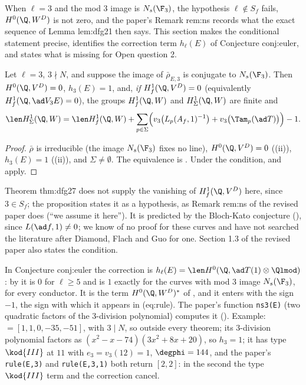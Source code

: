 When $\ell=3$ and the mod $3$ image is $N_s(\F_3)$, the hypothesis $\ell\notin S_f$ fails, $H^0(\Q,W^D)$ is not zero, and the paper's Remark rem:ns records what the
exact sequence of Lemma lem:dfg21 then says. This section makes the conditional statement precise, identifies the correction term $h_\ell(E)$ of Conjecture
conj:euler, and states what is missing for Open question 2.

\begin{proposition}\label{prop:blochkato:rem-ns}
Let $\ell=3$, $3\nmid N$, and suppose the image of $\bar\rho_{E,3}$ is conjugate to $N_s(\F_3)$. Then $H^0(\Q,V^D)=0$, $h_3(E)=1$, and, \emph{if} $H^1_f(\Q,V^D)=0$ (equivalently
$H^1_f(\Q,\ad V_3E)=0$), the groups $H^1_f(\Q,W)$ and $H^1_\Sigma(\Q,W)$ are finite and
\[
\len H^1_\Sigma(\Q,W)=\len H^1_f(\Q,W)+\sum_{p\in\Sigma}\Bigl(v_3\bigl(L_p(A_f,1)^{-1}\bigr)+v_3\bigl(\Tam_p(\ad T)\bigr)\Bigr)-1 .
\]
\end{proposition}

\begin{proof}
$\bar\rho$ is irreducible (the image $N_s(\F_3)$ fixes no line), $H^0(\Q,V^D)=0$ ((ii)), $h_3(E)=1$ ((ii)), and
$\Sigma\ne\emptyset$. The equivalence is . Under the condition,  and  apply.
\end{proof}

Theorem thm:dfg27 does not supply the vanishing of $H^1_f(\Q,V^D)$ here, since $3\in S_f$; the proposition states it as a hypothesis, as Remark rem:ns of the revised
paper does (``we assume it here''). It is predicted by the Bloch-Kato conjecture (), since $L(\ad f,1)\ne0$; we know of no proof for these
curves and have not searched the literature after Diamond, Flach and Guo for one. Section 1.3 of the revised paper also states the condition.

\begin{remark}\label{rem:blochkato:conj-euler-h}
In Conjecture conj:euler the correction is $h_\ell(E)=\len H^0(\Q,\ad T(1)\otimes\Qlmod)$: by  it is $0$ for $\ell\ge5$ and is $1$ exactly for the curves
with mod $3$ image $N_s(\F_3)$, for every conductor. It is the term $H^0(\Q,W^D)^*$ of , and it enters  with the sign $-1$,
the sign with which it appears in (eq:rule). The paper's function \texttt{ns3(E)} (two quadratic factors of the $3$-division polynomial) computes it ().
Example:  $=[1,1,0,-35,-51]$, with $3\mid N$, so outside every theorem; its $3$-division polynomial factors as $(x^2-x-74)(3x^2+8x+20)$, so $h_3=1$; it has
type $\kod{III}$ at $11$ with $e_3=v_3(12)=1$, $\degphi=144$, and the paper's \texttt{rule(E,3)} and \texttt{rule(E,3,1)} both return $[2,2]$: in the second the type
$\kod{III}$ term and the correction cancel.
\end{remark}


